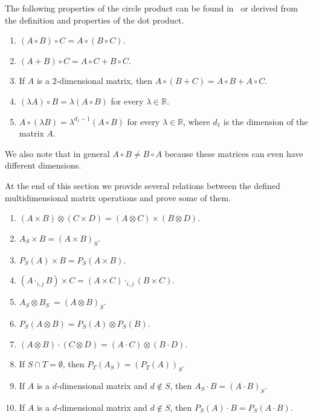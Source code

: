\documentclass[a4paper]{article}
\begin{document}
The following properties of  the circle product can be found in~\cite{shao.tensprod} or derived from the definition and properties of the dot product. 


\begin{utv} \label{circprop}
\item 
\begin{enumerate}
\item $(A  \circ B) \circ C = A \circ  (B  \circ C)$.
\item $(A + B) \circ  C = A \circ C + B \circ C$.
\item If $A$ is a $2$-dimensional matrix, then $A \circ (B + C) = A \circ B + A \circ C$.
\item $(\lambda A) \circ  B = \lambda (A \circ  B) $ for every $\lambda \in \mathbb{R}$.
\item $A \circ  (\lambda B) = \lambda^{d_1-1} (A \circ  B) $ for every $\lambda \in \mathbb{R}$, where $d_1$ is the dimension of the matrix $A$.
\end{enumerate}
\end{utv}


We also note that in general $A  \circ B \neq B \circ  A$ because these matrices can even have different dimensions. 

At the end of this section we provide several relations between the defined multidimensional matrix  operations and prove  some of them.  


\begin{utv}
\item 
\begin{enumerate}
\item $(A \times B) \otimes (C \times D) = (A \otimes C) \times (B \otimes D) $.
\item $A_S \times B = (A \times B)_S$.
\item $P_S (A) \times B = P_S(A \times B)$.
\item $( A\cdot_{i,j} B) \times C = (A \times C) \cdot_{i,j} (B \times C)$.
\item $A_S \otimes B_S \ = (A \otimes B)_S$.
\item $P_S(A \otimes B) = P_S (A) \otimes P_S(B)$.
\item $(A \otimes B) \cdot (C \otimes D) = (A \cdot C) \otimes (B \cdot D)$.
\item If $S \cap T = \emptyset$, then $P_T(A_S) = (P_T(A))_S$.
\item If $A$ is a $d$-dimensional matrix and $ d \not\in  S $, then $A_S \cdot B = (A \cdot B)_S$.
\item If $A$ is a $d$-dimensional matrix and $ d \not\in  S $, then $P_S(A) \cdot B = P_S(A \cdot B)$.
\end{enumerate}
\end{utv}
\end{document}
